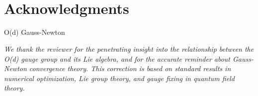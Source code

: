 \documentclass[11pt,a4paper]{article}
\theoremstyle{plain}
\theoremstyle{definition}
\theoremstyle{remark}
\begin{document}
\section*{ \\ Acknowledgments}

\noindent
 O(d)  Gauss-Newton



\bigskip
\noindent
\textit{We thank the reviewer for the penetrating insight into the relationship
between the O(d) gauge group and its Lie algebra, and for the accurate reminder
about Gauss-Newton convergence theory. This correction is based on standard
results in numerical optimization, Lie group theory, and gauge fixing in
quantum field theory.}
\end{document}
